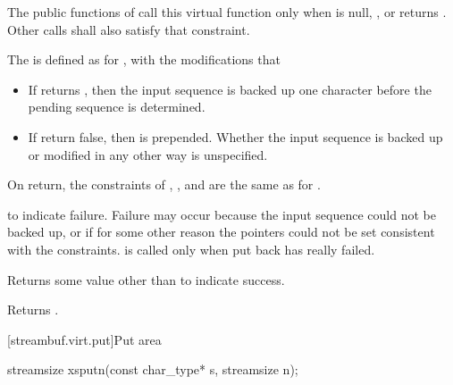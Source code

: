 \begin{itemdescr}
\pnum
\notes
The public functions of
call this virtual function only when
is null,
,
or
returns
.
Other calls shall also satisfy that constraint.

The
is defined as for
,
with the modifications that
\begin{itemize}
\item
If
returns
,
then the input sequence is backed up one character before the pending sequence is determined.
\item
If
return false, then  is prepended.
Whether the input sequence is backed up or modified in any other way is unspecified.
\end{itemize}

\pnum
\postcondition
On return, the constraints of
,
,
and
are the same as for
.

\pnum
\returns
{}
to indicate failure.
Failure may occur because the input sequence could not be backed up, or if for some
other reason the pointers could not be set consistent with the constraints.
is called only when put back has really failed.

\pnum
Returns some value other than
to indicate success.

\pnum
{}
Returns
.
\end{itemdescr}

[streambuf.virt.put]{Put area}

%
\begin{itemdecl}
streamsize xsputn(const char_type* s, streamsize n);
\end{itemdecl}

